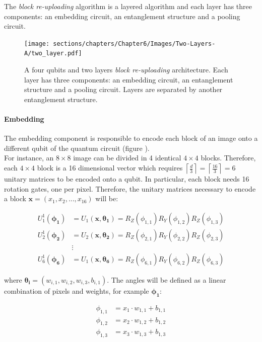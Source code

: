 The \textit{block re-uploading} algorithm is a layered algorithm and each layer has three components: 
an embedding circuit, an entanglement structure and a pooling circuit.

\begin{figure}[h]
    \centering
    \texttt{[image: sections/chapters/Chapter6/Images/Two-Layers-A/two\_layer.pdf]}
    \caption{A four qubits and two layers \textit{block re-uploading} architecture. Each layer has three 
    components: an embedding circuit, an entanglement structure and a pooling circuit.
    Layers are separated by another entanglement structure.}
\end{figure}

\paragraph{Embedding}
The embedding component is responsible to encode each block of an image onto a different qubit of 
the quantum circuit (figure \label{fig:block}).\\
For instance, an $8\times8$ image can be divided in 4 identical $4\times4$ blocks. 
Therefore, each $4\times4$ block is a 16 dimensional vector which requires 
$\left\lceil \frac{d}{3} \right\rceil = \left\lceil \frac{16}{3} \right\rceil = 6$ unitary matrices 
to be encoded onto a qubit.
In particular, each block needs 16 rotation gates, one per pixel.
Therefore, the unitary matrices necessary to encode a block $\bm{x} = (x_1, x_2, ..., x_{16})$ will be:

\begin{align}
    U^1_1(\bm{\phi_1}) &= U_1(\bm{x}, \bm{\theta_1}) = R_Z(\phi_{1,1}) R_Y(\phi_{1,2}) R_Z(\phi_{1,3}) \\
    U^1_2(\bm{\phi_2}) &= U_2(\bm{x}, \bm{\theta_2}) = R_Z(\phi_{2,1}) R_Y(\phi_{2,2}) R_Z(\phi_{2,3}) \\
    &\vdots \\
    U^1_6(\bm{\phi_6}) &= U_1(\bm{x}, \bm{\theta_6}) = R_Z(\phi_{6,1}) R_Y(\phi_{6,2}) R_Z(\phi_{6,3}) 
\end{align}

where $\bm{\theta_i} = (w_{i,1}, w_{i,2}, w_{i,3}, b_{i,1})$.
The angles will be defined as a linear combination of pixels and weights, for example $\bm{\phi_1}$:

\begin{align}
    \phi_{1,1} &= x_1 \cdot w_{1,1} + b_{1,1} \\
    \phi_{1,2} &= x_2 \cdot w_{1,2} + b_{1,2} \\
    \phi_{1,3} &= x_3 \cdot w_{1,3} + b_{1,3} \\
\end{align}


